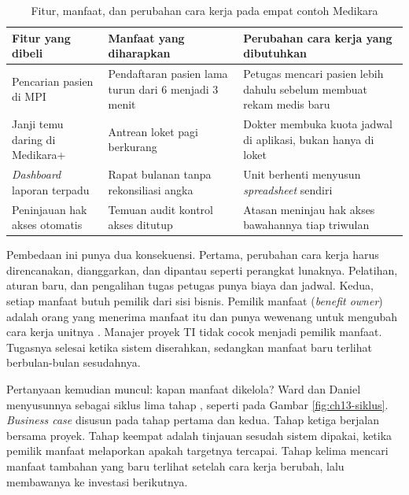 \begin{table}[!htb]
  \centering
  \caption{Fitur, manfaat, dan perubahan cara kerja pada empat contoh Medikara}
  \label{tab:ch13-fitur-manfaat}
  \footnotesize
  \begin{tabularx}{\textwidth}{>{\raggedright\arraybackslash}X
                               >{\raggedright\arraybackslash}X
                               >{\raggedright\arraybackslash}X}
    \hline
    \textbf{Fitur yang dibeli} & \textbf{Manfaat yang diharapkan} &
      \textbf{Perubahan cara kerja yang dibutuhkan} \\
    \hline
    Pencarian pasien di MPI & Pendaftaran pasien lama turun dari 6 menjadi
      3 menit & Petugas mencari pasien lebih dahulu sebelum membuat rekam
      medis baru \\
    \hline
    Janji temu daring di Medikara+ & Antrean loket pagi berkurang & Dokter
      membuka kuota jadwal di aplikasi, bukan hanya di loket \\
    \hline
    \textit{Dashboard} laporan terpadu & Rapat bulanan tanpa rekonsiliasi angka
      & Unit berhenti menyusun \textit{spreadsheet} sendiri \\
    \hline
    Peninjauan hak akses otomatis & Temuan audit kontrol akses ditutup &
      Atasan meninjau hak akses bawahannya tiap triwulan \\
    \hline
  \end{tabularx}
\end{table}

Pembedaan ini punya dua konsekuensi. Pertama, perubahan cara kerja harus
direncanakan, dianggarkan, dan dipantau seperti perangkat lunaknya. Pelatihan,
aturan baru, dan pengalihan tugas petugas punya biaya dan jadwal. Kedua,
setiap manfaat butuh pemilik dari sisi bisnis. Pemilik manfaat (\textit{benefit
owner}) adalah orang yang menerima manfaat itu dan punya wewenang untuk
mengubah cara kerja unitnya \cite{ward2012}. Manajer proyek TI tidak cocok
menjadi pemilik manfaat. Tugasnya selesai ketika sistem diserahkan, sedangkan
manfaat baru terlihat berbulan-bulan sesudahnya.

Pertanyaan kemudian muncul: kapan manfaat dikelola? Ward dan Daniel
menyusunnya sebagai siklus lima tahap \cite{ward2012}, seperti pada Gambar
\ref{fig:ch13-siklus}. \textit{Business case} disusun pada tahap pertama dan
kedua. Tahap ketiga berjalan bersama proyek. Tahap keempat adalah tinjauan
sesudah sistem dipakai, ketika pemilik manfaat melaporkan apakah targetnya
tercapai. Tahap kelima mencari manfaat tambahan yang baru terlihat setelah
cara kerja berubah, lalu membawanya ke investasi berikutnya.

